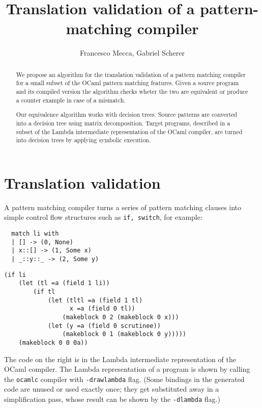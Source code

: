 \documentclass[12pt]{article}
\title{Translation validation of a pattern-matching compiler}
\author{Francesco Mecca, Gabriel Scherer}
\begin{document}
\maketitle

\begin{abstract}
We propose an algorithm for the translation validation of a pattern
matching compiler for a small subset of the OCaml pattern
matching features. Given a source program and its compiled version the
algorithm checks wheter the two are equivalent or produce a counter
example in case of a mismatch.

Our equivalence algorithm works with decision trees. Source patterns are
converted into a decision tree using matrix decomposition.
Target programs, described in a subset of the Lambda intermediate
representation of the OCaml compiler, are turned into decision trees
by applying symbolic execution.
\end{abstract}
\section{Translation validation}
A pattern matching compiler turns a series of pattern matching clauses
into simple control flow structures such as \texttt{if, switch}, for example:

\begin{minipage}{0.3\linewidth}
\begin{lstlisting}
  match li with
  | [] -> (0, None)
  | x::[] -> (1, Some x)
  | _::y::_ -> (2, Some y)
\end{lstlisting}
\end{minipage}
\hfill
\begin{minipage}{0.7\linewidth}
\begin{lstlisting}
(if li
    (let (tl =a (field 1 li))
        (if tl
            (let (tltl =a (field 1 tl)
                  x =a (field 0 tl))
                (makeblock 0 2 (makeblock 0 x)))
            (let (y =a (field 0 scrutinee))
                (makeblock 0 1 (makeblock 0 y)))))
    (makeblock 0 0 0a))
\end{lstlisting}
\end{minipage}

The code on the right is in the Lambda intermediate representation of
the OCaml compiler. The Lambda representation of a program is shown by
calling the \texttt{ocamlc} compiler with \texttt{-drawlambda} flag.
(Some bindings in the generated code are unused or used exactly once;
they get substituted away in a simplification pass, whose result can
be shown by the \texttt{-dlambda} flag.)
\end{document}

